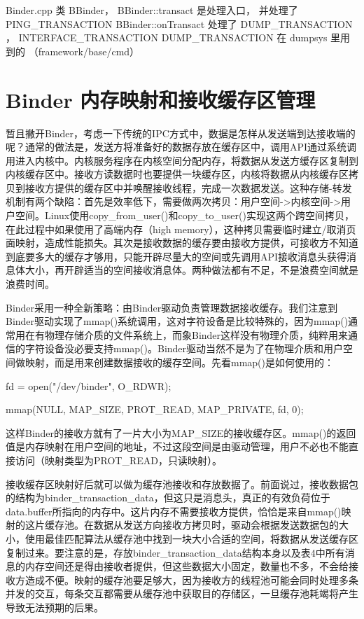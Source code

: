 \documentclass[a4paper,11pt]{article}
\begin{document}
Binder.cpp  类 BBinder，
BBinder::transact 是处理入口， 并处理了  PING_TRANSACTION 
BBinder::onTransact 处理了 DUMP_TRANSACTION ， INTERFACE_TRANSACTION 
DUMP_TRANSACTION 在 dumpsys 里用到的 （framework/base/cmd）

\section{ Binder 内存映射和接收缓存区管理}
暂且撇开Binder，考虑一下传统的IPC方式中，数据是怎样从发送端到达接收端的呢？通常的做法是，发送方将准备好的数据存放在缓存区中，调用API通过系统调用进入内核中。内核服务程序在内核空间分配内存，将数据从发送方缓存区复制到内核缓存区中。接收方读数据时也要提供一块缓存区，内核将数据从内核缓存区拷贝到接收方提供的缓存区中并唤醒接收线程，完成一次数据发送。这种存储-转发机制有两个缺陷：首先是效率低下，需要做两次拷贝：用户空间->内核空间->用户空间。Linux使用copy_from_user()和copy_to_user()实现这两个跨空间拷贝，在此过程中如果使用了高端内存（high memory），这种拷贝需要临时建立/取消页面映射，造成性能损失。其次是接收数据的缓存要由接收方提供，可接收方不知道到底要多大的缓存才够用，只能开辟尽量大的空间或先调用API接收消息头获得消息体大小，再开辟适当的空间接收消息体。两种做法都有不足，不是浪费空间就是浪费时间。

Binder采用一种全新策略：由Binder驱动负责管理数据接收缓存。我们注意到Binder驱动实现了mmap()系统调用，这对字符设备是比较特殊的，因为mmap()通常用在有物理存储介质的文件系统上，而象Binder这样没有物理介质，纯粹用来通信的字符设备没必要支持mmap()。Binder驱动当然不是为了在物理介质和用户空间做映射，而是用来创建数据接收的缓存空间。先看mmap()是如何使用的：

fd = open("/dev/binder", O_RDWR);

mmap(NULL, MAP_SIZE, PROT_READ, MAP_PRIVATE, fd, 0);

这样Binder的接收方就有了一片大小为MAP_SIZE的接收缓存区。mmap()的返回值是内存映射在用户空间的地址，不过这段空间是由驱动管理，用户不必也不能直接访问（映射类型为PROT_READ，只读映射）。

接收缓存区映射好后就可以做为缓存池接收和存放数据了。前面说过，接收数据包的结构为binder_transaction_data，但这只是消息头，真正的有效负荷位于data.buffer所指向的内存中。这片内存不需要接收方提供，恰恰是来自mmap()映射的这片缓存池。在数据从发送方向接收方拷贝时，驱动会根据发送数据包的大小，使用最佳匹配算法从缓存池中找到一块大小合适的空间，将数据从发送缓存区复制过来。要注意的是，存放binder_transaction_data结构本身以及表4中所有消息的内存空间还是得由接收者提供，但这些数据大小固定，数量也不多，不会给接收方造成不便。映射的缓存池要足够大，因为接收方的线程池可能会同时处理多条并发的交互，每条交互都需要从缓存池中获取目的存储区，一旦缓存池耗竭将产生导致无法预期的后果。
\end{document}
